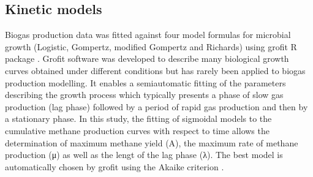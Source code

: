 \subsection{Kinetic models}
Biogas production data was fitted against four model formulas for microbial growth (Logistic, Gompertz, modified Gompertz and Richards) using grofit R package \cite{Kahm_2010}. Grofit software was developed to describe many biological growth curves obtained under different conditions but has rarely been applied to biogas production modelling. It enables a semiautomatic fitting of the parameters describing the growth process which typically presents a phase of slow gas production (lag phase) followed by a period of rapid gas production and then by a stationary phase. In this study, the fitting of sigmoidal models to the cumulative methane production curves  with respect to time allows the determination of maximum methane yield (A), the maximum rate of methane production (μ) as well as the lengt of the lag phase (λ). The best model is automatically chosen by grofit using the Akaike criterion \cite{Hasenbrink_2006}.
